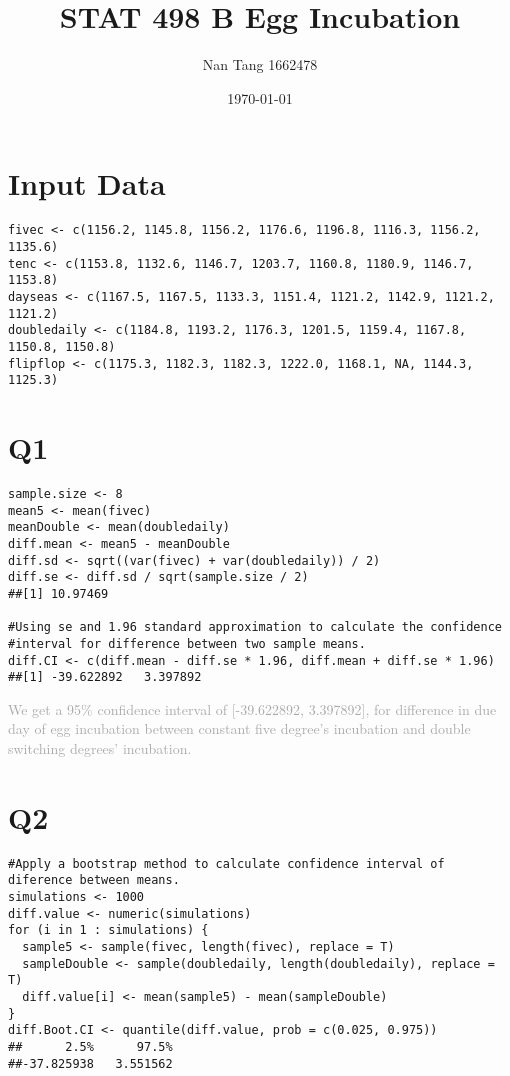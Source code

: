 \documentclass[12pt]{article}
\begin{document}
\title{STAT 498 B Egg Incubation}
\author{Nan Tang 1662478}
\date{\today}
\maketitle

\section*{Input Data}
\begin{verbatim}
fivec <- c(1156.2, 1145.8, 1156.2, 1176.6, 1196.8, 1116.3, 1156.2, 1135.6)
tenc <- c(1153.8, 1132.6, 1146.7, 1203.7, 1160.8, 1180.9, 1146.7, 1153.8)
dayseas <- c(1167.5, 1167.5, 1133.3, 1151.4, 1121.2, 1142.9, 1121.2, 1121.2)
doubledaily <- c(1184.8, 1193.2, 1176.3, 1201.5, 1159.4, 1167.8, 1150.8, 1150.8)
flipflop <- c(1175.3, 1182.3, 1182.3, 1222.0, 1168.1, NA, 1144.3, 1125.3)
\end{verbatim}

\section*{Q1}
\begin{verbatim}
sample.size <- 8
mean5 <- mean(fivec)
meanDouble <- mean(doubledaily)
diff.mean <- mean5 - meanDouble
diff.sd <- sqrt((var(fivec) + var(doubledaily)) / 2)
diff.se <- diff.sd / sqrt(sample.size / 2)
##[1] 10.97469

#Using se and 1.96 standard approximation to calculate the confidence 
#interval for difference between two sample means.
diff.CI <- c(diff.mean - diff.se * 1.96, diff.mean + diff.se * 1.96)
##[1] -39.622892   3.397892
\end{verbatim}

\noindent \textcolor{darkgray}{We get a 95$\%$ confidence interval of [-39.622892, 3.397892], for difference in due day of egg incubation between constant five degree's incubation and double switching degrees' incubation.}

\section*{Q2}
\begin{verbatim}
#Apply a bootstrap method to calculate confidence interval of diference between means.
simulations <- 1000
diff.value <- numeric(simulations)
for (i in 1 : simulations) {
  sample5 <- sample(fivec, length(fivec), replace = T)
  sampleDouble <- sample(doubledaily, length(doubledaily), replace = T)
  diff.value[i] <- mean(sample5) - mean(sampleDouble)
}
diff.Boot.CI <- quantile(diff.value, prob = c(0.025, 0.975))
##      2.5%      97.5% 
##-37.825938   3.551562 
\end{verbatim}
\end{document}
